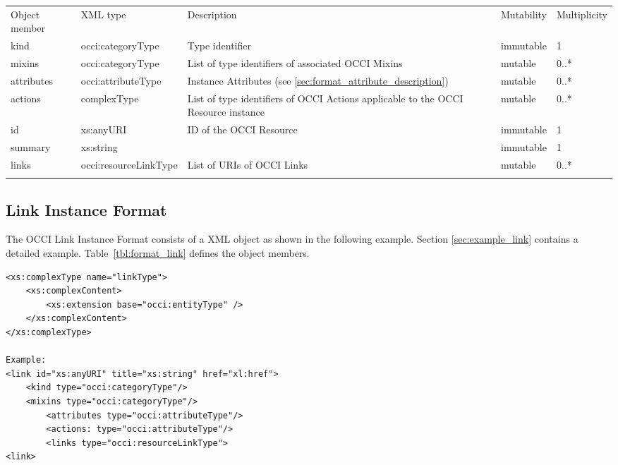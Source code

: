 \documentclass[10pt,a4paper]{article}
\begin{document}
 {
    \begin{tabularx}{\textwidth}{llXll}
    \toprule
    Object member & XML type & Description & Mutability & Multiplicity \\
    \colrule
    kind & occi:categoryType & Type identifier & immutable & 1 \\

    mixins & occi:categoryType & List of type identifiers of associated OCCI
Mixins  &
mutable & 0..* \\

    attributes & occi:attributeType & Instance Attributes (see
\ref{sec:format_attribute_description}) & mutable & 0..* \\
    
    actions & complexType & List of type identifiers of OCCI
Actions applicable to the OCCI Resource instance & mutable & 0..* \\
    
    id & xs:anyURI & ID of the OCCI Resource & immutable & 1\\

	summary & xs:string &  & immutable & 1\\
            
    links & occi:resourceLinkType & List of URIs of OCCI Links & mutable & 0..*\\
    \botrule
    \end{tabularx}
}

\subsection{Link Instance Format}
\label{sec:format_link}

The OCCI Link Instance Format consists of a XML object as shown in the
following example. Section \ref{sec:example_link} contains a detailed example.
Table~\ref{tbl:format_link} defines the object members.
\begin{lstlisting}
<xs:complexType name="linkType">
	<xs:complexContent>
		<xs:extension base="occi:entityType" />
	</xs:complexContent>
</xs:complexType>

Example:
<link id="xs:anyURI" title="xs:string" href="xl:href">
	<kind type="occi:categoryType"/>
	<mixins type="occi:categoryType"/>
        <attributes type="occi:attributeType"/>
        <actions: type="occi:attributeType"/>
        <links type="occi:resourceLinkType">
<link>
\end{lstlisting}
\end{document}
